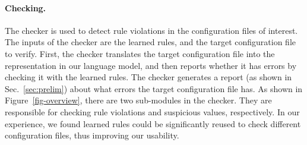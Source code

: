 
\paragraph{Checking.}
The checker is used to detect rule violations in the configuration
files of interest. The inputs of the checker are the learned rules,
and the target configuration file to verify.
First, the checker translates the target configuration file into
the representation in our language model, and
then reports whether it has errors by checking it with the
learned rules. 
The checker generates a report (as shown in Sec.~\ref{sec:prelim}) about 
what errors the target configuration file has.
As shown in Figure~\ref{fig-overview},
there are two sub-modules in the checker. They are responsible for
checking rule violations and suspicious values, respectively.
In our experience, we found learned rules could be significantly reused
to check different configuration files, thus improving our usability.  
